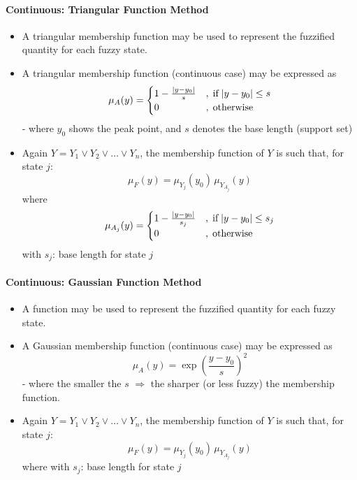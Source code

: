 \documentclass{tron}
\begin{document}
\paragraph{Continuous: Triangular Function Method}
\begin{itemize}
	\item A triangular membership function may be used to represent the fuzziﬁed quantity for each fuzzy state.
	\item A triangular membership function (continuous case) may be expressed as
	\begin{equation}
		\mu_A(y) = \begin{cases}
			1 - \frac{|y-y_0|}{s} & ,\;\text{if}\; |y-y_0| \leq s \\
			0 & ,\;\text{otherwise}
		\end{cases}
	\end{equation}
	- where $y_0$ shows the peak point, and $s$ denotes the base length (support set)
	\item Again $Y=Y_1 \lor  Y_2 \lor \dots \lor Y_n$, the membership function of $Y$ is such that, for state $j$:
	\begin{equation}
		\mu_F(y) = \mu_{Y_j} (y_0)\, \mu_{Y_{A_j}} (y)
	\end{equation}
	where
	\begin{equation}
		\mu_{A_j}(y) = \begin{cases}
			1 - \frac{|y-y_0|}{s_j} & ,\;\text{if}\; |y-y_0| \leq s_j \\
			0 & ,\;\text{otherwise}
		\end{cases}
	\end{equation}
	with $s_j$: base length for state $j$
\end{itemize}

\paragraph{Continuous: Gaussian Function Method}
\begin{itemize}
	\item A  function may be used to represent the fuzziﬁed quantity for each fuzzy state.
	\item A Gaussian membership function (continuous case) may be expressed as
	\begin{equation}
		\mu_A(y) = \exp (\frac{y-y_0}{s})^2
	\end{equation}
	- where the smaller the $s$ $\Rightarrow$ the sharper (or less fuzzy) the membership function.
	\item Again $Y=Y_1 \lor  Y_2 \lor \dots \lor Y_n$, the membership function of $Y$ is such that, for state $j$:
	\begin{equation}
		\mu_F(y) = \mu_{Y_j} (y_0)\, \mu_{Y_{A_j}} (y)
	\end{equation}
	where
	with $s_j$: base length for state $j$
\end{itemize}
\end{document}
